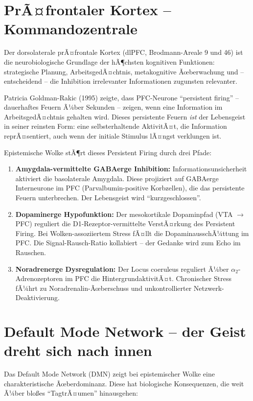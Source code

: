 ﻿\documentclass[12pt,a4paper]{report}
\theoremstyle{plain}
\theoremstyle{definition}
\theoremstyle{remark}
\begin{document}
	\section{PrÃ¤frontaler Kortex -- Kommandozentrale}
	
	Der dorsolaterale prÃ¤frontale Kortex (dlPFC, Brodmann-Areale 9 und 46)
	ist die neurobiologische Grundlage der hÃ¶chsten kognitiven Funktionen:
	strategische Planung, ArbeitsgedÃ¤chtnis, metakognitive Ãœberwachung
	und -- entscheidend -- die Inhibition irrelevanter Informationen
	zugunsten relevanter.
	
	Patricia Goldman-Rakic (1995) zeigte, dass PFC-Neurone ``persistent
	firing'' -- dauerhaftes Feuern Ã¼ber Sekunden -- zeigen, wenn
	eine Information im ArbeitsgedÃ¤chtnis gehalten wird.
	Dieses persistente Feuern \emph{ist} der Lebensgeist in seiner
	reinsten Form: eine selbsterhaltende AktivitÃ¤t, die Information
	reprÃ¤sentiert, auch wenn der initiale Stimulus lÃ¤ngst verklungen ist.
	
	Epistemische Wolke stÃ¶rt dieses Persistent Firing durch drei Pfade:
	\begin{enumerate}[label=(\roman*), leftmargin=1.6cm]
		\item \textbf{Amygdala-vermittelte GABAerge Inhibition:}
		Informationsunsicherheit aktiviert die basolaterale Amygdala.
		Diese projiziert auf GABAerge Interneurone im PFC (Parvalbumin-positive
		Korbzellen), die das persistente Feuern unterbrechen.
		Der Lebensgeist wird ``kurzgeschlossen''.
		\item \textbf{Dopaminerge Hypofunktion:}
		Der mesokortikale Dopaminpfad (VTA $\to$ PFC) reguliert die
		D1-Rezeptor-vermittelte VerstÃ¤rkung des Persistent Firing.
		Bei Wol\-ken-assoziiertem Stress fÃ¤llt die DopaminausschÃ¼ttung
		im PFC. Die Signal-Rausch-Ratio kollabiert -- der Gedanke wird
		zum Echo im Rauschen.
		\item \textbf{Noradrenerge Dysregulation:}
		Der Locus coeruleus reguliert Ã¼ber $\alpha_2$-Adreno\-zeptoren im PFC
		die HintergrundaktivitÃ¤t. Chronischer Stress fÃ¼hrt zu
		Nora\-drena\-lin-Ãœberschuss und unkontrollierter Netzwerk-Deaktivierung.
	\end{enumerate}
	
	\section{Default Mode Network -- der Geist dreht sich nach innen}
	
	Das Default Mode Network (DMN) zeigt bei epistemischer Wolke eine charakteristische
	Ãœberdominanz. Diese hat biologische Konsequenzen, die weit Ã¼ber blo\ss{}es
	``TagtrÃ¤umen'' hinausgehen:
	
\end{document}
